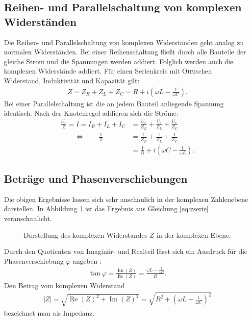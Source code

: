 \documentclass[12pt,a4paper,titlepage,headinclude]{scrartcl}
\numberwithin{equation}{subsection}
\newcommand{\aeqiv}{\ensuremath{\qquad \Longleftrightarrow \qquad}} %
\newcommand{\person}[1]{\textsc{#1}}
\begin{document}
\subsection{Reihen- und Parallelschaltung von komplexen Widerständen}
\label{sec:reihepara}
Die Reihen- und Parallelschaltung von komplexen Widerständen geht analog zu normalen Widerständen. Bei einer Reihenschaltung fließt durch alle Bauteile der gleiche Strom und die Spannungen werden addiert. Folglich werden auch die komplexen Widerstände addiert. Für einen Serienkreis mit \person{Ohm}schen Widerstand, Induktivität und Kapazität gilt:
\begin{align}
	Z=Z_R+Z_L+Z_C=R+i\left( \omega L-\frac{1}{\omega C} \right).
	\label{eq:zserie}
\end{align}
Bei einer Parallelschaltung ist die an jedem Bauteil anliegende Spannung identisch. Nach der Knotenregel \cite[55]{demtroeder2} addieren sich die Ströme:
\begin{align}
	\frac{U_e}{Z}=I=I_R+I_L+I_C&=\frac{U_e}{Z_R}+\frac{U_e}{Z_L}+\frac{U_e}{Z_C}\\
	\aeqiv \frac{1}{Z}&=\frac{1}{Z_R}+\frac{1}{Z_L}+\frac{1}{Z_C}\\
	&=\frac{1}{R}+i\left( \omega C- \frac{1}{\omega L}\right).
	\label{eq:zpara}
\end{align}
\subsection{Beträge und Phasenverschiebungen}
Die obigen Ergebnisse lassen sich sehr anschaulich in der komplexen Zahlenebene darstellen. In Abbildung \ref{fig:theozeiger} ist das Ergebnis aus Gleichung \eqref{eq:zserie} veranschaulicht. 
\begin{figure}[htb]
	\centering
	
	\caption{Darstellung des komplexen Widerstandes $Z$ in der komplexen Ebene.}
	\label{fig:theozeiger}
\end{figure}
Durch den Quotienten von Imaginär- und Realteil lässt sich ein Ausdruck für die Phasenverschiebung $\varphi$ angeben \cite[153]{demtroeder2}:
\begin{align}
	\tan\varphi=\frac{\operatorname{Im}(Z)}{\operatorname{Re}(Z)}=\frac{\omega L-\frac{1}{\omega C}}{R}.
	\label{eq:phase}
\end{align}
Den Betrag vom komplexen Widerstand 
\begin{align}
	|Z|=\sqrt{\operatorname{Re}(Z)^2+\operatorname{Im}(Z)^2}=\sqrt{R^2+\left(\omega L-\frac{1}{\omega C}\right)^2}
	\label{eq:impedanz}
\end{align}
bezeichnet man als Impedanz.
\end{document}
